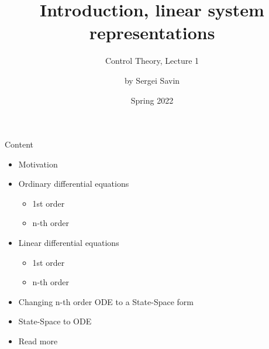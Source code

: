 \documentclass{beamer}
\title{Introduction, linear system representations}
\subtitle{Control Theory, Lecture 1}
\author{by Sergei Savin}
\date{Spring 2022}
\begin{document}
\maketitle


\begin{frame}{Content}

\begin{itemize}
\item Motivation
\item Ordinary differential equations
    \begin{itemize}
    \item 1st order
    \item n-th order
    \end{itemize}
\item Linear differential equations
    \begin{itemize}
    \item 1st order
    \item n-th order
    \end{itemize}
\item Changing n-th order ODE to a State-Space form
\item State-Space to ODE
\item Read more
\end{itemize}

\end{frame}
\end{document}
